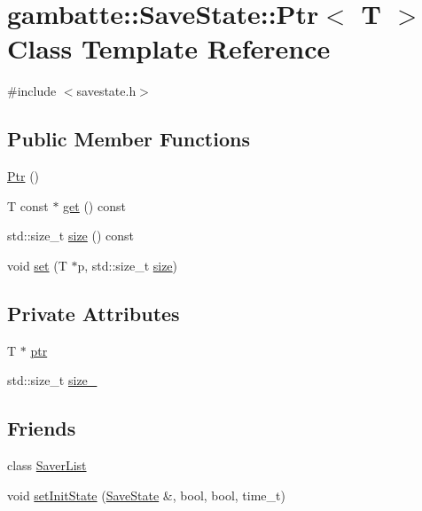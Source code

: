 \hypertarget{classgambatte_1_1SaveState_1_1Ptr}{}\section{gambatte\+:\+:Save\+State\+:\+:Ptr$<$ T $>$ Class Template Reference}
\label{classgambatte_1_1SaveState_1_1Ptr}


{\ttfamily \#include $<$savestate.\+h$>$}

\subsection*{Public Member Functions}
\begin{DoxyCompactItemize}
\item 
\hyperlink{classgambatte_1_1SaveState_1_1Ptr_a28c24b44e44253751473b5be0cafc352}{Ptr} ()
\item 
T const  $\ast$ \hyperlink{classgambatte_1_1SaveState_1_1Ptr_a3355e119e6b34068df59310c7c5a4d07}{get} () const
\item 
std\+::size\+\_\+t \hyperlink{classgambatte_1_1SaveState_1_1Ptr_a600e0bb965ba840c0f3fb6aadbb3b869}{size} () const
\item 
void \hyperlink{classgambatte_1_1SaveState_1_1Ptr_a2053fa7f8a0195b8b9fbc12f7d43790b}{set} (T $\ast$p, std\+::size\+\_\+t \hyperlink{ioapi_8h_a014d89bd76f74ef3a29c8f04b473eb76}{size})
\end{DoxyCompactItemize}
\subsection*{Private Attributes}
\begin{DoxyCompactItemize}
\item 
T $\ast$ \hyperlink{classgambatte_1_1SaveState_1_1Ptr_ae4126a6760cf99f8d1f550eaa1e4a0d4}{ptr}
\item 
std\+::size\+\_\+t \hyperlink{classgambatte_1_1SaveState_1_1Ptr_a84fe597543084e4ede9111b78f8148dd}{size\+\_\+}
\end{DoxyCompactItemize}
\subsection*{Friends}
\begin{DoxyCompactItemize}
\item 
class \hyperlink{classgambatte_1_1SaveState_1_1Ptr_aa5593b9169916e39c212a9e5cf267294}{Saver\+List}
\item 
void \hyperlink{classgambatte_1_1SaveState_1_1Ptr_a84e5deb5ff49529cfb3e1be0718d4acd}{set\+Init\+State} (\hyperlink{structgambatte_1_1SaveState}{Save\+State} \&, bool, bool, time\+\_\+t)
\end{DoxyCompactItemize}



